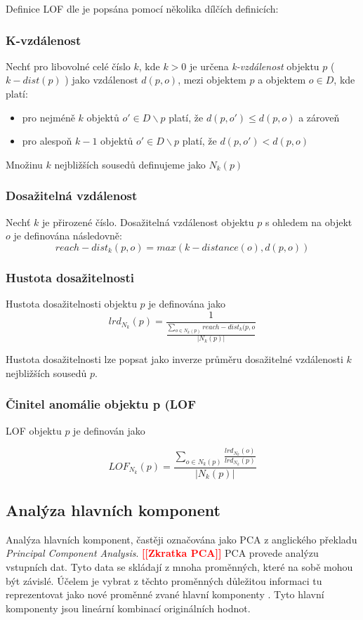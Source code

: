 \documentclass[thesis=M,czech]{FITthesis}[2012/10/20]
\newcommand{\todo}[1]{\textcolor{red}{\textbf{[[#1]]}}}
\begin{document}
			Definice LOF dle \cite{LOF} je popsána pomocí několika dílčích definicích: 
			
			\subsubsection{K-vzdálenost}
				Nechť pro libovolné celé číslo $k$, kde $k > 0$ je určena \textit{k-vzdálenost} objektu $p$ ( $k-dist(p)$ ) jako vzdálenost $d(p, o)$, mezi objektem $p$ a objektem $o \in D$, kde platí:
			
				\begin{itemize} 
					\item pro nejméně $k$ objektů $o' \in D \backslash {p}$	platí, že $d(p, o') \leq d(p, o)$ a zároveň
					\item pro alespoň $k-1$ objektů $o' \in D \backslash {p}$ platí, že $d(p, o') < d(p, o)$
				\end{itemize}
				Množinu $k$ nejbližších sousedů definujeme jako $N_k(p)$
		
			\subsubsection{Dosažitelná vzdálenost}
				Nechť $k$ je přirozené číslo. Dosažitelná vzdálenost objektu $p$ s ohledem na objekt $o$ je definována následovně: 
				$$ reach-dist_k(p, o) = max (k-distance(o), d(p, o)) $$
				
			\subsubsection{Hustota dosažitelnosti}
				Hustota dosažitelnosti objektu $p$ je definována jako
				$$ lrd_{N_k}(p) = \frac{1}{ \frac{\sum_{o \in N_k(p)} reach-dist_k(p,o}{|N_k(p)|}} $$
				
				Hustota dosažitelnosti lze popsat jako inverze průměru dosažitelné vzdálenosti $k$ nejbližších sousedů $p$.
				
			\subsubsection{Činitel anomálie objektu p (LOF}
				LOF objektu $p$ je definován jako 
				
				$$LOF_{N_k}(p) = \frac{\sum_{o \in N_k(p)} \frac{lrd_{N_k}(o)}{lrd_{N_k}(p)}}{|N_k(p)|} $$
			
			
		
		
		\subsection{Analýza hlavních komponent}
		\label{sec:pca}
		Analýza hlavních komponent, častěji označována jako PCA z anglického překladu \textit{Principal Component Analysis}. \todo{Zkratka PCA} PCA provede analýzu vstupních dat. Tyto data se skládají z mnoha proměnných, které na sobě mohou být závislé. Účelem je vybrat z těchto proměnných důležitou informaci tu reprezentovat jako nové proměnné zvané hlavní komponenty \cite{PCA_book}. Tyto hlavní komponenty jsou lineární kombinací originálních hodnot.
		
\end{document}
